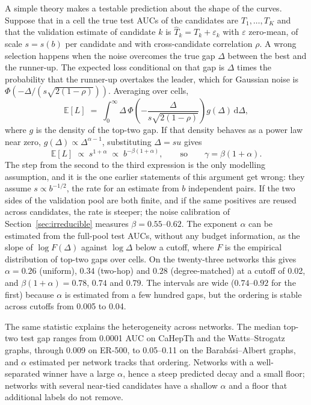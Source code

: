 \documentclass{comjnl}
\begin{document}
A simple theory makes a testable prediction about the shape of the curves. Suppose that in a cell the true test AUCs of the candidates are $T_1,\dots,T_K$ and that the validation estimate of candidate $k$ is $\hat T_k = T_k + \varepsilon_k$ with $\varepsilon$ zero-mean, of scale $s=s(b)$ per candidate and with cross-candidate correlation $\rho$. A wrong selection happens when the noise overcomes the true gap $\Delta$ between the best and the runner-up. The expected loss conditional on that gap is $\Delta$ times the probability that the runner-up overtakes the leader, which for Gaussian noise is $\Phi(-\Delta/(s\sqrt{2(1-\rho)}))$. Averaging over cells,
\begin{equation}
\mathbb{E}[L] \;=\; \int_0^{\infty} \Delta\,\Phi\!\left(-\frac{\Delta}{s\sqrt{2(1-\rho)}}\right) g(\Delta)\,\mathrm{d}\Delta ,
\label{eq:el}
\end{equation}
where $g$ is the density of the top-two gap. If that density behaves as a power law near zero, $g(\Delta)\propto\Delta^{\alpha-1}$, substituting $\Delta=su$ gives
\begin{equation}
\mathbb{E}[L] \;\propto\; s^{1+\alpha} \;\propto\; b^{-\beta(1+\alpha)},
\qquad\text{so}\qquad \gamma=\beta(1+\alpha).
\label{eq:gamma}
\end{equation}
The step from the second to the third expression is the only modelling assumption, and it is the one earlier statements of this argument get wrong: they assume $s\propto b^{-1/2}$, the rate for an estimate from $b$ independent pairs. If the two sides of the validation pool are both finite, and if the same positives are reused across candidates, the rate is steeper; the noise calibration of Section~\ref{sec:irreducible} measures $\beta=0.55$--$0.62$. The exponent $\alpha$ can be estimated from the full-pool test AUCs, without any budget information, as the slope of $\log F(\Delta)$ against $\log\Delta$ below a cutoff, where $F$ is the empirical distribution of top-two gaps over cells. On the twenty-three networks this gives $\alpha=0.26$ (uniform), $0.34$ (two-hop) and $0.28$ (degree-matched) at a cutoff of 0.02, and $\beta(1+\alpha)=0.78$, $0.74$ and $0.79$. The intervals are wide ($0.74$--$0.92$ for the first) because $\alpha$ is estimated from a few hundred gaps, but the ordering is stable across cutoffs from 0.005 to 0.04.

The same statistic explains the heterogeneity across networks. The median top-two test gap ranges from 0.0001 AUC on CaHepTh and the Watts--Strogatz graphs, through 0.009 on ER-500, to 0.05--0.11 on the Barab\'asi--Albert graphs, and $\alpha$ estimated per network tracks that ordering. Networks with a well-separated winner have a large $\alpha$, hence a steep predicted decay and a small floor; networks with several near-tied candidates have a shallow $\alpha$ and a floor that additional labels do not remove.
\end{document}
